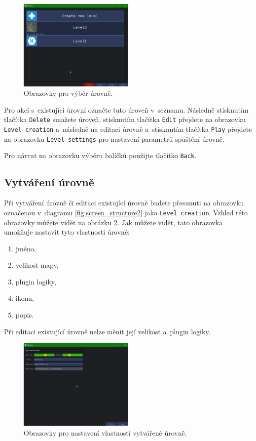 \begin{figure}[h]
	\centering
	\includegraphics[width=0.5\textwidth]{img/LevelPickingScreen.png}
	\caption{Obrazovky pro výběr úrovně.}
	\label{fig:levelpicking}
\end{figure}

Pro akci s~existující úrovní označte tuto úroveň v~seznamu. Následně stisknutím tlačítka \texttt{Delete} smažete úroveň, stisknutím tlačítka \texttt{Edit} přejdete na obrazovku \texttt{Level creation} a~následně na editaci úrovně a~stisknutím tlačítka \texttt{Play} přejdete na obrazovku \texttt{Level settings} pro nastavení parametrů spuštění úrovně.

Pro návrat na obrazovku výběru balíčků použijte tlačítko \texttt{Back}.
\subsection{Vytváření úrovně}
Při vytváření úrovně či editaci existující úrovně budete přesunuti na obrazovku označenou v~diagramu \ref{fig:screen_structure2} jako \texttt{Level creation}. Vzhled této obrazovky můžete vidět na obrázku \ref{fig:levelcreation}. Jak můžete vidět, tato obrazovka umožňuje nastavit tyto vlastnosti úrovně:

\begin{enumerate}
	\item jméno,
	\item velikost mapy,
	\item plugin logiky,
	\item ikonu,
	\item popis.
\end{enumerate}

Při editaci existující úrovně nelze měnit její velikost a~plugin logiky.

\begin{figure}[h]
	\centering
	\includegraphics[width=0.5\textwidth]{img/LevelCreationScreen.png}
	\caption{Obrazovky pro nastavení vlastností vytvářené úrovně.}
	\label{fig:levelcreation}
\end{figure}

